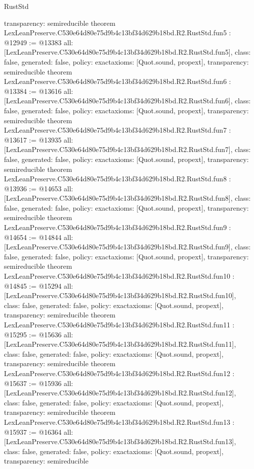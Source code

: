 \begin{lexlean}{RustStd}
\begin{coremodule}
{  transparency: semireducible
}
theorem LexLeanPreserve.C530e64d80e75d9b4c13bf34d629b18bd.R2.RustStd.fun5 : @12949 := @13383 {
  all: [LexLeanPreserve.C530e64d80e75d9b4c13bf34d629b18bd.R2.RustStd.fun5],
  class: false,
  generated: false,
  policy: exact{axioms: [Quot.sound, propext]},
  transparency: semireducible
}
theorem LexLeanPreserve.C530e64d80e75d9b4c13bf34d629b18bd.R2.RustStd.fun6 : @13384 := @13616 {
  all: [LexLeanPreserve.C530e64d80e75d9b4c13bf34d629b18bd.R2.RustStd.fun6],
  class: false,
  generated: false,
  policy: exact{axioms: [Quot.sound, propext]},
  transparency: semireducible
}
theorem LexLeanPreserve.C530e64d80e75d9b4c13bf34d629b18bd.R2.RustStd.fun7 : @13617 := @13935 {
  all: [LexLeanPreserve.C530e64d80e75d9b4c13bf34d629b18bd.R2.RustStd.fun7],
  class: false,
  generated: false,
  policy: exact{axioms: [Quot.sound, propext]},
  transparency: semireducible
}
theorem LexLeanPreserve.C530e64d80e75d9b4c13bf34d629b18bd.R2.RustStd.fun8 : @13936 := @14653 {
  all: [LexLeanPreserve.C530e64d80e75d9b4c13bf34d629b18bd.R2.RustStd.fun8],
  class: false,
  generated: false,
  policy: exact{axioms: [Quot.sound, propext]},
  transparency: semireducible
}
theorem LexLeanPreserve.C530e64d80e75d9b4c13bf34d629b18bd.R2.RustStd.fun9 : @14654 := @14844 {
  all: [LexLeanPreserve.C530e64d80e75d9b4c13bf34d629b18bd.R2.RustStd.fun9],
  class: false,
  generated: false,
  policy: exact{axioms: [Quot.sound, propext]},
  transparency: semireducible
}
theorem LexLeanPreserve.C530e64d80e75d9b4c13bf34d629b18bd.R2.RustStd.fun10 : @14845 := @15294 {
  all: [LexLeanPreserve.C530e64d80e75d9b4c13bf34d629b18bd.R2.RustStd.fun10],
  class: false,
  generated: false,
  policy: exact{axioms: [Quot.sound, propext]},
  transparency: semireducible
}
theorem LexLeanPreserve.C530e64d80e75d9b4c13bf34d629b18bd.R2.RustStd.fun11 : @15295 := @15636 {
  all: [LexLeanPreserve.C530e64d80e75d9b4c13bf34d629b18bd.R2.RustStd.fun11],
  class: false,
  generated: false,
  policy: exact{axioms: [Quot.sound, propext]},
  transparency: semireducible
}
theorem LexLeanPreserve.C530e64d80e75d9b4c13bf34d629b18bd.R2.RustStd.fun12 : @15637 := @15936 {
  all: [LexLeanPreserve.C530e64d80e75d9b4c13bf34d629b18bd.R2.RustStd.fun12],
  class: false,
  generated: false,
  policy: exact{axioms: [Quot.sound, propext]},
  transparency: semireducible
}
theorem LexLeanPreserve.C530e64d80e75d9b4c13bf34d629b18bd.R2.RustStd.fun13 : @15937 := @16364 {
  all: [LexLeanPreserve.C530e64d80e75d9b4c13bf34d629b18bd.R2.RustStd.fun13],
  class: false,
  generated: false,
  policy: exact{axioms: [Quot.sound, propext]},
  transparency: semireducible
}
\end{coremodule}
\end{lexlean}
